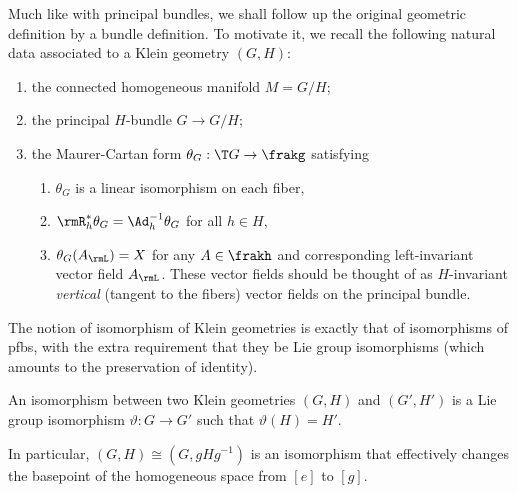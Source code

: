 


Much like with principal bundles, we shall follow up the original geometric definition by a bundle definition. To motivate it, we recall the following natural data associated to a Klein geometry $(G,H)$:
\begin{enumerate}[label=(\alph*)]
    \item the connected homogeneous manifold $M=G\slash H$;
    \item the principal $H$-bundle $G\to G\slash H$;
    \item the Maurer-Cartan form $\theta_G:\T G\to \frakg$ satisfying
    \begin{enumerate}[label=(\roman*)]
        \item $\theta_G$ is a linear isomorphism on each fiber,
        \item $\rmR_h^\ast \theta_G=\Ad_h^{-1}\theta_G$ for all $h\in H$,
        \item $\theta_G(A_\rmL)=X$ for any $A\in \frakh$ and corresponding left-invariant vector field $A_\rmL$. These vector fields should be thought of as $H$-invariant \emph{vertical} (tangent to the fibers) vector fields on the principal bundle.
    \end{enumerate}
\end{enumerate}

The notion of isomorphism of Klein geometries is exactly that of isomorphisms of \glspl{pfb}, with the extra requirement that they be Lie group isomorphisms (which amounts to the preservation of identity).



\begin{defn}
    An isomorphism between two Klein geometries $(G,H)$ and $(G',H')$ is a Lie group isomorphism $\vartheta:G\to G'$ such that $\vartheta(H)=H'$.
\end{defn}

In particular, $(G,H)\cong (G,gHg^{-1})$ is an isomorphism that effectively changes the basepoint of the homogeneous space from $[e]$ to $[g]$.


